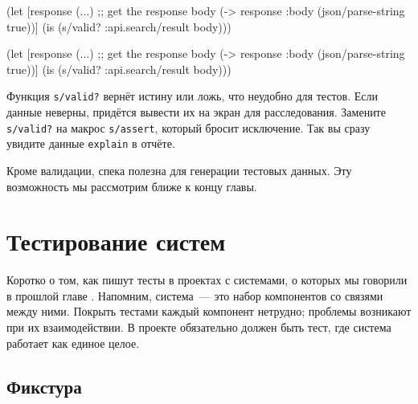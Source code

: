 
\ifnarrow

\begin{english}
  \begin{clojure}
(let [response (...) ;; get the response
      body (-> response
               :body
               (json/parse-string
                 true))]
  (is (s/valid? :api.search/result
                body)))
  \end{clojure}
\end{english}

\else

\begin{english}
  \begin{clojure}
(let [response (...) ;; get the response
      body (-> response
               :body
               (json/parse-string true))]
  (is (s/valid? :api.search/result body)))
  \end{clojure}
\end{english}

\fi

Функция \verb|s/valid?| вернёт истину или ложь, что неудобно для тестов. Если
данные неверны, придётся вывести их на экран для расследования. Замените
\verb|s/valid?| на макрос \verb|s/assert|, который бросит исключение. Так
вы сразу увидите данные \verb|explain| в отчёте.


Кроме валидации, спека полезна для генерации тестовых данных. Эту возможность мы
рассмотрим ближе к концу главы.

\section{Тестирование систем}


Коротко о том, как пишут тесты в проектах с системами, о которых мы говорили в
прошлой главе . Напомним, система~--- это набор компонентов со
связями между ними. Покрыть тестами каждый компонент нетрудно; проблемы
возникают при их взаимодействии. В проекте обязательно должен быть тест, где
система работает как единое целое.

\subsection{Фикстура}


